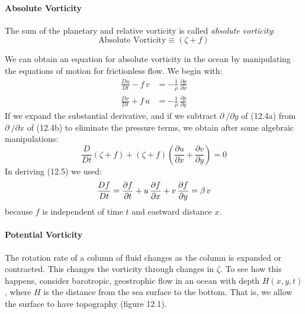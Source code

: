 \paragraph{Absolute Vorticity}
The sum of the planetary and relative vorticity is called
\textit{absolute vorticity}:
\begin{equation}
\boxed{ \text{Absolute Vorticity} \equiv (\zeta + f) }
\end{equation}

We can obtain an equation for absolute vorticity in the ocean by
manipulating the equations of motion for frictionless flow. We begin
with:
\begin{subequations}
\begin{align}
\frac{Du}{Dt} -f\,v &= -\frac{1}{\rho}\,\frac{\partial{p}}{\partial{x}} \\
\frac{Dv}{Dt} +f\,u &= -\frac{1}{\rho}\,\frac{\partial{p}}{\partial{y}}
\end{align}
\end{subequations}
If we expand the substantial derivative, and if we subtract
$\partial\:/\partial{y}$ of (12.4a) from $\partial\:/\partial{x}$ of (12.4b)
to eliminate the pressure terms, we obtain after some
algebraic manipulations:
\begin{equation}
\boxed{ \frac{D}{Dt}\left(\zeta +f  \right) + \left(\zeta +f  \right)
\left(\frac{\partial{u}}{\partial{x}} +
\frac{\partial{v}}{\partial{y}} \right) = 0 }
\end{equation}
In deriving (12.5) we used:
\begin{equation}
\frac{Df}{Dt} = \frac{\partial{f}}{\partial{t}}
+u\,\frac{\partial{f}}{\partial{x}} +v\,\frac{\partial{f}}{\partial{y}} = \beta
\,v \notag
\end{equation}
because $f$ is independent of time $t$ and eastward distance $x$.

\paragraph{Potential Vorticity}
The rotation rate of a column of fluid changes as the column is
expanded or contracted. This changes the vorticity through changes in
$\zeta$. To see how this happens, consider barotropic,
geostrophic flow in an ocean
with depth $H(x, y, t)$, where $H$ is the distance from the sea
surface to the bottom. That is, we allow the surface to have
topography (figure 12.1).

